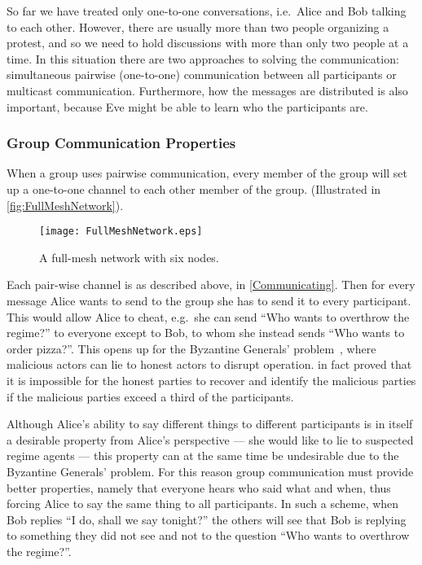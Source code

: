 So far we have treated only one-to-one conversations, i.e.\ Alice and Bob 
talking to each other.
However, there are usually more than two people organizing a protest, and so we 
need to hold discussions with more than only two people at a time.
In this situation there are two approaches to solving the communication:
simultaneous pairwise (one-to-one) communication between all participants or 
multicast communication.
Furthermore, how the messages are distributed is also important, because Eve 
might be able to learn who the participants are.

\subsubsection{Group Communication Properties}
\label{GroupProperties}

When a group uses pairwise communication, every member of the group will set up 
a one-to-one channel to each other member of the group.
(Illustrated in \cref{fig:FullMeshNetwork}).
\begin{figure}
  \centering
  \texttt{[image: FullMeshNetwork.eps]}
  \caption{%
    A full-mesh network with six nodes.
  }
\end{figure}
Each pair-wise channel is as described above, in \cref{Communicating}.
Then for every message Alice wants to send to the group she has to send it to 
every participant.
This would allow Alice to cheat, e.g.\ she can send \enquote{Who wants to 
  overthrow the regime?} to everyone except to Bob, to whom she instead sends 
\enquote{Who wants to order pizza?}.
This opens up for the Byzantine Generals' problem~\cite{ByzantineGenerals}, 
where malicious actors can lie to honest actors to disrupt operation.
\citet{ByzantineGenerals} in fact proved that it is impossible for the honest 
parties to recover and identify the malicious parties if the malicious parties 
exceed a third of the participants.
  
Although Alice's ability to say different things to different participants is 
in itself a desirable property from Alice's perspective --- she would like to 
lie to suspected regime agents --- this property can at the same time be 
undesirable due to the Byzantine Generals' problem.
For this reason group communication must provide better properties, namely that 
everyone hears who said what and when, thus forcing Alice to say the same thing 
to all participants.
In such a scheme, when Bob replies \enquote{I do, shall we say tonight?} the 
others will see that Bob is replying to something they did not see and not to 
the question \enquote{Who wants to overthrow the regime?}.

